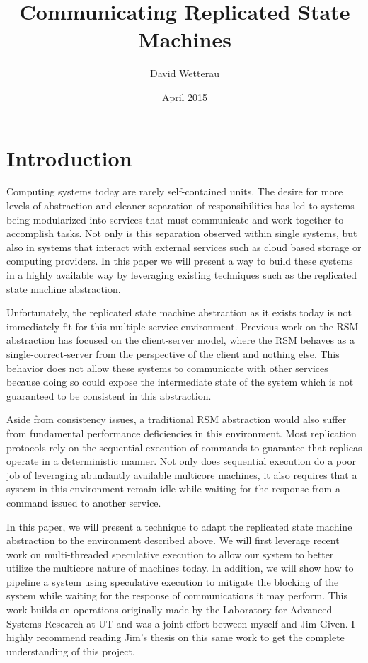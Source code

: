 \documentclass[11pt, oneside]{report}
\title{Communicating Replicated State Machines}
\author{David Wetterau}
\date{April 2015}
\begin{document}
\maketitle

\tableofcontents

\chapter{Introduction}\label{Introduction}
Computing systems today are rarely self-contained units. The desire for more levels of abstraction and cleaner separation of responsibilities has led to systems being modularized into services that must communicate and work together to accomplish tasks. Not only is this separation observed within single systems, but also in systems that interact with external services such as cloud based storage or computing providers. In this paper we will present a way to build these systems in a highly available way by leveraging existing techniques such as the replicated state machine abstraction.

Unfortunately, the replicated state machine abstraction as it exists today is not immediately fit for this multiple service environment. Previous work on the RSM abstraction has focused on the client-server model, where the RSM behaves as a single-correct-server from the perspective of the client and nothing else. This behavior does not allow these systems to communicate with other services because doing so could expose the intermediate state of the system which is not guaranteed to be consistent in this abstraction.

Aside from consistency issues, a traditional RSM abstraction would also suffer from fundamental performance deficiencies in this environment. Most replication protocols rely on the sequential execution of commands to guarantee that replicas operate in a deterministic manner. Not only does sequential execution do a poor job of leveraging abundantly available multicore machines, it also requires that a system in this environment remain idle while waiting for the response from a command issued to another service.

In this paper, we will present a technique to adapt the replicated state machine abstraction to the environment described above. We will first leverage recent work on multi-threaded speculative execution to allow our system to better utilize the multicore nature of machines today. In addition, we will show how to pipeline a system using speculative execution to mitigate the blocking of the system while waiting for the response of communications it may perform. This work builds on operations originally made by the Laboratory for Advanced Systems Research at UT and was a joint effort between myself and Jim Given. I highly recommend reading Jim’s thesis on this same work to get the complete understanding of this project.
\end{document}
